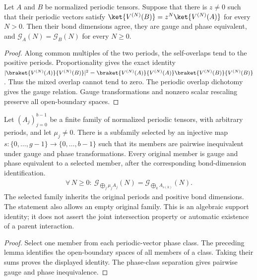 \begin{lemma}
    \label{thm:periodic_phase_relation_support}
    \leanok
    Let $A$ and $B$ be normalized periodic tensors. Suppose that there is
    $z\ne0$ such that their periodic vectors satisfy
    $\ket{V^{(N)}(B)}=z^N\ket{V^{(N)}(A)}$ for every $N>0$.
    Then their bond dimensions agree, they are gauge and phase equivalent,
    and $\mathcal G_A(N)=\mathcal G_B(N)$ for every $N\ge0$.
\end{lemma}
\begin{proof}\leanok
    Along common multiples of the two periods, the self-overlaps tend to
    the positive periods. Proportionality gives the exact identity
    $|\braket{V^{(N)}(A)}{V^{(N)}(B)}|^2
        =\braket{V^{(N)}(A)}{V^{(N)}(A)}\braket{V^{(N)}(B)}{V^{(N)}(B)}$.
    Thus the mixed overlap cannot tend to zero. The periodic overlap
    dichotomy gives the gauge relation. Gauge transformations and nonzero
    scalar rescaling preserve all open-boundary spaces.
\end{proof}

\begin{lemma}
    \label{thm:periodic_sector_representatives_exact_support}
    \leanok
    Let $(A_j)_{j=0}^{b-1}$ be a finite family of normalized periodic tensors,
    with arbitrary periods, and let $\mu_j\ne0$.
    There is a subfamily selected by an injective map
    $s:\{0,\ldots,g-1\}\to\{0,\ldots,b-1\}$ such that its members are pairwise
    inequivalent under gauge and phase transformations. Every original
    member is gauge and phase equivalent to a selected member, after the
    corresponding bond-dimension identification. \begin{align}
        \forall\,N\ge0:\ \mathcal G_{\bigoplus_j\mu_jA_j}(N)
        =\mathcal G_{\bigoplus_k A_{s(k)}}(N).
    \end{align}
    The selected family inherits the original periods and positive bond
    dimensions. The statement also allows an empty original family.
    This is an algebraic support identity; it does not assert the joint
    intersection property or automatic existence of a parent interaction.
\end{lemma}
\begin{proof}\leanok
    Select one member from each periodic-vector phase class. The preceding
    lemma identifies the open-boundary spaces of all members of a class.
    Taking their sums proves the displayed identity. The phase-class
    separation gives pairwise gauge and phase inequivalence.
\end{proof}

